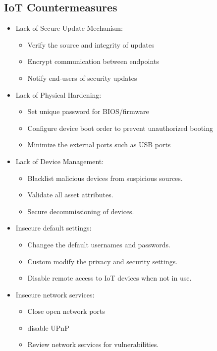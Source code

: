 \subsection{IoT Countermeasures}
\begin{itemize}
    \item Lack of Secure Update Mechanism:
    \begin{itemize}
        \item Verify the source and integrity of updates
        \item Encrypt communication between endpoints
        \item Notify end-users of security updates
    \end{itemize}
    \item Lack of Physical Hardening:
    \begin{itemize}
        \item Set unique password for BIOS/firmware
        \item Configure device boot order to prevent unauthorized booting
        \item Minimize the external ports such as USB ports
    \end{itemize}
    \item Lack of Device Management:
    \begin{itemize}
        \item Blacklist malicious devices from suspicious sources.
        \item Validate all asset attributes.
        \item Secure decommissioning of devices.
    \end{itemize}
    \item Insecure default settings:
    \begin{itemize}
        \item Changee the default usernames and passwords.
        \item Custom modify the privacy and security settings.
        \item Disable remote access to IoT devices when not in use.
    \end{itemize}
    \item Insecure network services:
    \begin{itemize}
        \item Close open network ports
        \item disable UPnP
        \item Review network services for vulnerabilities.
    \end{itemize}

\end{itemize}
